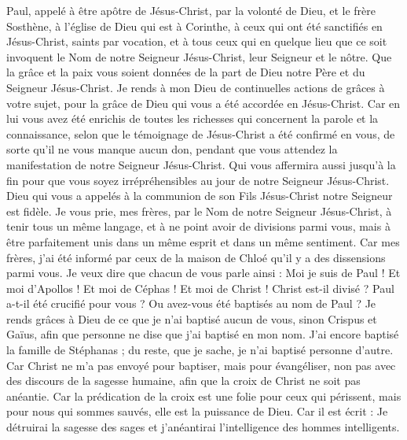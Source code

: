 \begin{multicols}{2}
\VerseOne{}Paul, appelé à être apôtre de Jésus-Christ, par la volonté de Dieu, et le frère Sosthène,
à l'église de Dieu qui est à Corinthe, à ceux qui ont été sanctifiés en Jésus-Christ, saints par vocation, et à tous ceux qui en quelque lieu que ce soit invoquent le Nom de notre Seigneur Jésus-Christ, leur Seigneur et le nôtre.
Que la grâce et la paix vous soient données de la part de Dieu notre Père et du Seigneur Jésus-Christ.
Je rends à mon Dieu de continuelles actions de grâces à votre sujet, pour la grâce de Dieu qui vous a été accordée en Jésus-Christ.
Car en lui vous avez été enrichis de toutes les richesses qui concernent la parole et la connaissance,
selon que le témoignage de Jésus-Christ a été confirmé en vous,
de sorte qu'il ne vous manque aucun don, pendant que vous attendez la manifestation de notre Seigneur Jésus-Christ.
Qui vous affermira aussi jusqu’à la fin pour que vous soyez irrépréhensibles au jour de notre Seigneur Jésus-Christ.
Dieu qui vous a appelés à la communion de son Fils Jésus-Christ notre Seigneur est fidèle.
Je vous prie, mes frères, par le Nom de notre Seigneur Jésus-Christ, à tenir tous un même langage, et à ne point avoir de divisions parmi vous, mais à être parfaitement unis dans un même esprit et dans un même sentiment.
Car mes frères, j’ai été informé par ceux de la maison de Chloé qu'il y a des dissensions parmi vous.
Je veux dire que chacun de vous parle ainsi : Moi je suis de Paul ! Et moi d'Apollos ! Et moi de Céphas ! Et moi de Christ !
Christ est-il divisé ? Paul a-t-il été crucifié pour vous ? Ou avez-vous été baptisés au nom de Paul ?
Je rends grâces à Dieu de ce que je n'ai baptisé aucun de vous, sinon Crispus et Gaïus,
afin que personne ne dise que j'ai baptisé en mon nom.
J'ai encore baptisé la famille de Stéphanas ; du reste, que je sache, je n’ai baptisé personne d’autre.
Car Christ ne m'a pas envoyé pour baptiser, mais pour évangéliser, non pas avec des discours de la sagesse humaine, afin que la croix de Christ ne soit pas anéantie.
Car la prédication de la croix est une folie pour ceux qui périssent, mais pour nous qui sommes sauvés, elle est la puissance de Dieu.
Car il est écrit : Je détruirai la sagesse des sages et j'anéantirai l'intelligence des hommes intelligents.

\end{multicols}
